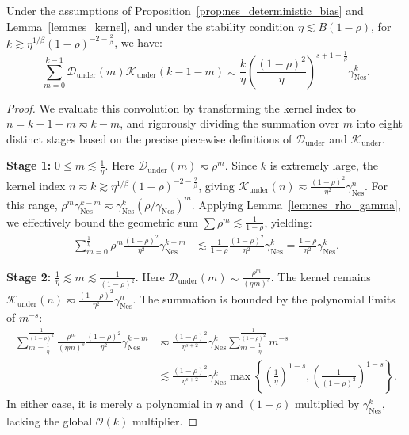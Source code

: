 \begin{lemma}
\label{lem:nes_conv_under_under}
Under the assumptions of Proposition~\ref{prop:nes_deterministic_bias} and Lemma~\ref{lem:nes_kernel}, and under the stability condition $\eta\lesssim B(1-\rho)$, for $k \gtrsim \eta^{1/\beta}(1-\rho)^{-2-\frac{2}{\beta}}$, we have:
\begin{equation*}
    \sum_{m=0}^{k-1} \mathcal{D}_{\mathrm{under}}(m) \mathcal{K}_{\mathrm{under}}(k-1-m) \eqsim \frac{k}{\eta} \left(\frac{(1-\rho)^2}{\eta}\right)^{s+1+\frac{1}{\beta}} \gamma_{\mathrm{Nes}}^k.
\end{equation*}
\end{lemma}
\begin{proof}
We evaluate this convolution by transforming the kernel index to $n = k-1-m \eqsim k-m$, and rigorously dividing the summation over $m$ into eight distinct stages based on the precise piecewise definitions of $\mathcal{D}_{\mathrm{under}}$ and $\mathcal{K}_{\mathrm{under}}$.

\textbf{Stage 1:} $0 \le m \lesssim \frac{1}{\eta}$. 
Here $\mathcal{D}_{\mathrm{under}}(m) \eqsim \rho^m$. Since $k$ is extremely large, the kernel index $n \eqsim k \gtrsim \eta^{1/\beta}(1-\rho)^{-2-\frac{2}{\beta}}$, giving $\mathcal{K}_{\mathrm{under}}(n) \eqsim \frac{(1-\rho)^2}{\eta^2} \gamma_{\mathrm{Nes}}^n$. 
For this range, $\rho^m \gamma_{\mathrm{Nes}}^{k-m} \eqsim \gamma_{\mathrm{Nes}}^k (\rho/\gamma_{\mathrm{Nes}})^m$. Applying Lemma~\ref{lem:nes_rho_gamma}, we effectively bound the geometric sum $\sum \rho^m \lesssim \frac{1}{1-\rho}$, yielding:
\begin{align*}
    \sum_{m=0}^{\frac{1}{\eta}} \rho^m \frac{(1-\rho)^2}{\eta^2} \gamma_{\mathrm{Nes}}^{k-m} 
    &\lesssim \frac{1}{1-\rho} \frac{(1-\rho)^2}{\eta^2} \gamma_{\mathrm{Nes}}^k = \frac{1-\rho}{\eta^2} \gamma_{\mathrm{Nes}}^k.
\end{align*}

\textbf{Stage 2:} $\frac{1}{\eta} \lesssim m \lesssim \frac{1}{(1-\rho)^2}$. 
Here $\mathcal{D}_{\mathrm{under}}(m) \eqsim \frac{\rho^m}{(\eta m)^s}$. The kernel remains $\mathcal{K}_{\mathrm{under}}(n) \eqsim \frac{(1-\rho)^2}{\eta^2} \gamma_{\mathrm{Nes}}^n$. 
The summation is bounded by the polynomial limits of $m^{-s}$:
\begin{align*}
    \sum_{m=\frac{1}{\eta}}^{\frac{1}{(1-\rho)^2}} \frac{\rho^m}{(\eta m)^s} \frac{(1-\rho)^2}{\eta^2} \gamma_{\mathrm{Nes}}^{k-m} 
    &\eqsim \frac{(1-\rho)^2}{\eta^{s+2}} \gamma_{\mathrm{Nes}}^k \sum_{m=\frac{1}{\eta}}^{\frac{1}{(1-\rho)^2}} m^{-s} \\
    &\lesssim \frac{(1-\rho)^2}{\eta^{s+2}} \gamma_{\mathrm{Nes}}^k \max\left\{ \left(\frac{1}{\eta}\right)^{1-s}, \left(\frac{1}{(1-\rho)^2}\right)^{1-s} \right\}.
\end{align*}
In either case, it is merely a polynomial in $\eta$ and $(1-\rho)$ multiplied by $\gamma_{\mathrm{Nes}}^k$, lacking the global $\mathcal{O}(k)$ multiplier.


\end{proof}
